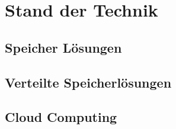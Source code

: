 \chapter{Stand der Technik}\label{ch:background}

\section{Speicher Lösungen}


\section{Verteilte Speicherlösungen}


\section{Cloud Computing}
